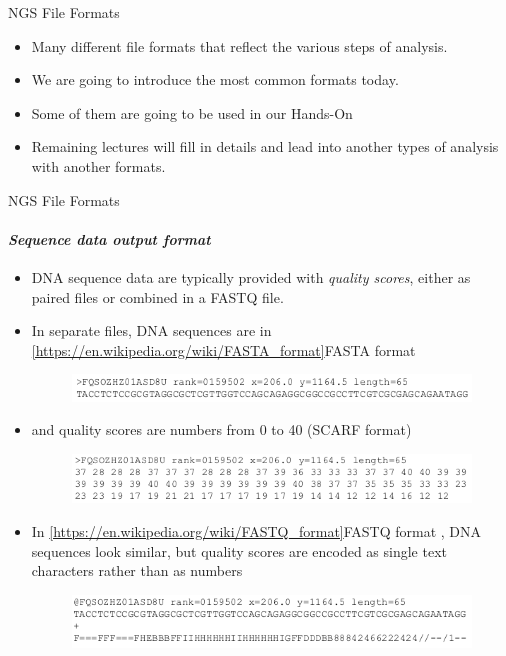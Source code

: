 \documentclass{if-beamer}
\begin{document}
\begin{frame}{NGS File Formats}
\begin{large}
\begin{itemize}
    \item Many different file formats that reflect the various steps of analysis.
    \item We are going to introduce the most common formats today.
    \item Some of them are going to be used in our Hands-On 
    \item Remaining lectures will fill in details and lead into another types of analysis with another formats.
\end{itemize} 
\end{large}
\end{frame}
\begin{frame}{NGS File Formats}
\framesubtitle{\emph{Sequence data output format}}
\begin{itemize}
    \item DNA sequence data are typically provided with \textit{quality scores}, either as paired files or combined in a FASTQ file.
    \item In separate files, DNA sequences are in \cref{https://en.wikipedia.org/wiki/FASTA_format}{FASTA format}
    \begin{figure}
    \centering
    \includegraphics[scale=0.6]{fasta_sample.PNG}
    \end{figure}
    \item and quality scores are numbers from 0 to 40 (SCARF format)
    \begin{figure}
    \centering
    \includegraphics[scale=0.6]{scarf_sample.PNG}
    \end{figure}
    \item In \cref{https://en.wikipedia.org/wiki/FASTQ_format}{FASTQ format} , DNA sequences look similar, but quality scores are encoded as single text characters rather than as numbers
    \begin{figure}
    \centering
    \includegraphics[scale=0.6]{fastq_sample.PNG}
    \end{figure}
\end{itemize} 
\end{frame}
\end{document}
